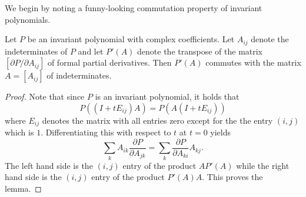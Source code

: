 \documentclass[a4paper,openany]{scrbook}
\begin{document}
We begin by noting a funny-looking commutation property of invariant polynomials.

\begin{lemma}\label{lem:invariant polynomial commutation}
Let $P$ be an invariant polynomial with complex coefficients. Let $A_{ij}$ denote the indeterminates of $P$ and let $P'(A)$ denote the transpose of the matrix $[\partial P/\partial A_{ij}]$ of formal partial derivatives. Then $P'(A)$ commutes with the matrix $A = [A_{ij}]$ of indeterminates.
\begin{proof}
Note that since $P$ is an invariant polynomial, it holds that
\[P((I + tE_{ij})A) = P(A(I + tE_{ij}))\]
where $E_{ij}$ denotes the matrix with all entries zero except for the the entry $(i, j)$ which is $1$. Differentiating this with respect to $t$ at $t = 0$ yields
\[\sum_k A_{ik} \frac{\partial P}{\partial A_{jk}} = \sum_k \frac{\partial P}{\partial A_{ki}} A_{kj}.\]
The left hand side is the $(i, j)$ entry of the product $AP'(A)$ while the right hand side is the $(i, j)$ entry of the product $P'(A)A$. This proves the lemma.
\end{proof}
\end{lemma}
\end{document}
